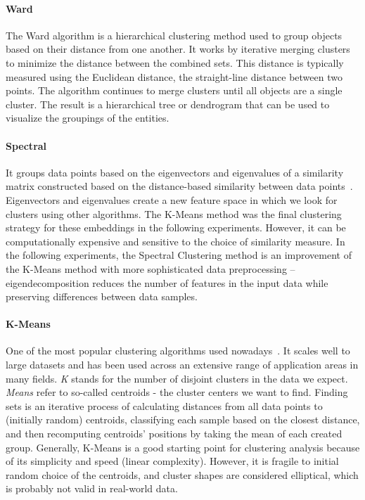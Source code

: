 \documentclass[a4paper, 10pt, twoside]{report}
\begin{document}
\paragraph{Ward}
The Ward algorithm is a hierarchical clustering method used to group objects based on their distance from one another. It works by iterative merging clusters to minimize the distance between the combined sets. This distance is typically measured using the Euclidean distance, the straight-line distance between two points. The algorithm continues to merge clusters until all objects are a single cluster. The result is a hierarchical tree or dendrogram that can be used to visualize the groupings of the entities.

\paragraph{Spectral}
It groups data points based on the eigenvectors and eigenvalues of a similarity matrix constructed based on the distance-based similarity between data points~\cite{SpectralClustering}. Eigenvectors and eigenvalues create a new feature space in which we look for clusters using other algorithms. The K-Means method was the final clustering strategy for these embeddings in the following experiments. However, it can be computationally expensive and sensitive to the choice of similarity measure. In the following experiments, the Spectral Clustering method is an improvement of the K-Means method with more sophisticated data preprocessing -- eigendecomposition reduces the number of features in the input data while preserving differences between data samples.

\paragraph{K-Means}
One of the most popular clustering algorithms used nowadays~\cite{tan2018introduction}. It scales well to large datasets and has been used across an extensive range of application areas in many fields. \textit{K} stands for the number of disjoint clusters in the data we expect. \textit{Means} refer to so-called centroids - the cluster centers we want to find. Finding sets is an iterative process of calculating distances from all data points to (initially random) centroids, classifying each sample based on the closest distance, and then recomputing centroids' positions by taking the mean of each created group. Generally, K-Means is a good starting point for clustering analysis because of its simplicity and speed (linear complexity). However, it is fragile to initial random choice of the centroids, and cluster shapes are considered elliptical, which is probably not valid in real-world data.
\end{document}
